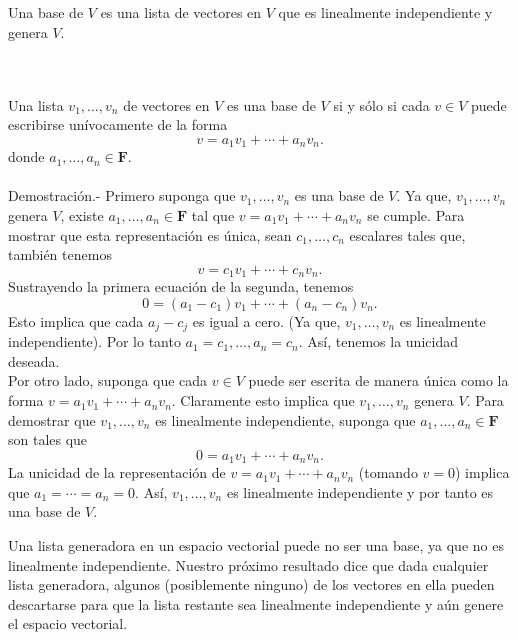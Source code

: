 \vspace{1cm}



\setcounter{mydef}{26}
\begin{mydef}[Base]\;\\\\
    Una base de $V$ es una lista de vectores en $V$ que es linealmente independiente y genera $V$.
\end{mydef}

\begin{myteo}\;\\\\
    Una lista $v_1,\ldots,v_n$ de vectores en $V$ es una base de $V$ si y sólo si cada $v\in V$ puede escribirse unívocamente de la forma 
    $$v=a_1v_1+\cdots+a_nv_n.$$
    donde $a_1,\ldots,a_n\in \textbf{F}$.\\\\
	Demostración.-\; Primero suponga que $v_1,\ldots,v_n$ es una base de $V$. Ya que, $v_1,\ldots,v_n$ genera $V$, existe $a_1,\ldots,a_n\in \textbf{F}$ tal que $v=a_1v_1+\cdots+a_nv_n$ se cumple. Para mostrar que esta representación es única, sean $c_1,\ldots,c_n$ escalares tales que, también tenemos
	$$v=c_1v_1+\cdots+c_nv_n.$$
	Sustrayendo la primera ecuación de la segunda, tenemos
	$$0=(a_1-c_1)v_1+\cdots+(a_n-c_n)v_n.$$
	Esto implica que cada $a_j-c_j$ es igual a cero. (Ya que, $v_1,\ldots,v_n$ es linealmente independiente). Por lo tanto $a_1=c_1,\ldots,a_n=c_n$. Así, tenemos la unicidad deseada.\\

	Por otro lado, suponga que cada $v\in V$ puede ser escrita de manera única como la forma $v=a_1v_1+\cdots+a_nv_n$. Claramente esto implica que $v_1,\ldots,v_n$ genera $V$. Para demostrar que $v_1,\ldots,v_n$ es linealmente independiente, suponga que $a_1,\ldots,a_n\in \textbf{F}$ son tales que
	$$0=a_1v_1+\cdots+a_nv_n.$$
	La unicidad de la representación de $v=a_1v_1+\cdots+a_nv_n$ (tomando $v=0$) implica que $a_1=\cdots=a_n=0$. Así, $v_1,\dots,v_n$ es linealmente independiente y por tanto es una base de $V$.
\end{myteo}

Una lista generadora en un espacio vectorial puede no ser una base, ya que no es linealmente independiente. Nuestro próximo resultado dice que dada cualquier lista generadora, algunos (posiblemente ninguno) de los vectores en ella pueden descartarse para que la lista restante sea linealmente independiente y aún genere el espacio vectorial.

